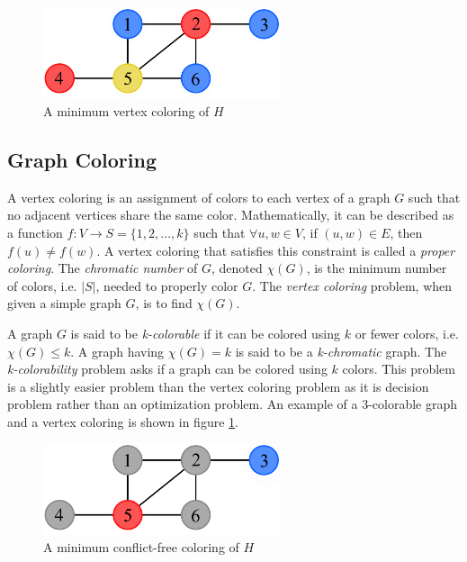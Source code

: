 \documentclass{sig-alternate}
\begin{document}
\begin{figure}[h]
	\centering
	\includegraphics[width=7cm]{../figures/example-vcp.pdf}
	\caption{A minimum vertex coloring of $H$}\label{fig:vcp-example}
\end{figure}


\subsection{Graph Coloring}
\label{sec:coloring}
A vertex coloring is an assignment of colors to each vertex of a graph $G$ such that no adjacent vertices share the same color. Mathematically, it can be described as a function $f : V \rightarrow S = \{1, 2, \dots, k\}$ such that $\forall u,w \in V$, if $(u,w) \in E$, then $f(u) \neq f(w)$. A vertex coloring that satisfies this constraint is called a \emph{proper coloring}. The \emph{chromatic number} of $G$, denoted $\chi(G)$, is the minimum number of colors, i.e. $|S|$, needed to properly color $G$. The \emph{vertex coloring} problem, when given a simple graph $G$, is to find $\chi(G)$. \cite{bondy1976graph}

A graph $G$ is said to be \emph{k-colorable} if it can be colored using $k$ or fewer colors, i.e. $\chi(G) \leq k$. A graph having $\chi(G) = k$ is said to be a \emph{k-chromatic} graph. The \emph{k-colorability} problem asks if a graph can be colored using $k$ colors. This problem is a slightly easier problem than the vertex coloring problem as it is decision problem rather than an optimization problem. An example of a 3-colorable graph and a vertex coloring is shown in figure \ref{fig:vcp-example}.

\begin{figure}[h]
	\centering
	\includegraphics[width=7cm]{../figures/example-cfcp.pdf}
	\caption{A minimum conflict-free coloring of $H$}\label{fig:cfcp-example}
\end{figure}
\end{document}
